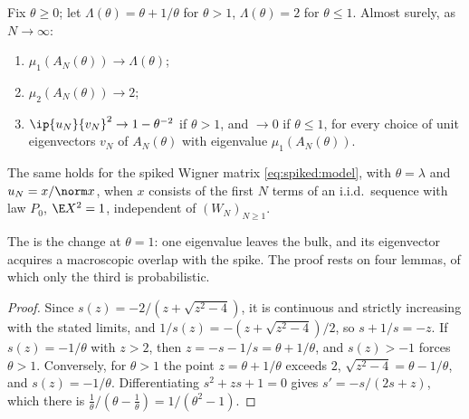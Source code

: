 \begin{refsection}
\begin{theorem}\label{thm:spiked:bbp}
Fix $\theta\ge0$; let $\Lambda(\theta)=\theta+1/\theta$ for $\theta>1$, $\Lambda(\theta)=2$ for $\theta\le1$. Almost surely, as $N\to\infty$:
\begin{enumerate}
\item $\mu_1(A_N(\theta))\to\Lambda(\theta)$;
\item $\mu_2(A_N(\theta))\to2$;
\item $\ip{u_N}{v_N}^2\to1-\theta^{-2}$ if $\theta>1$, and $\to0$ if $\theta\le1$, for every choice of unit eigenvectors $v_N$ of $A_N(\theta)$ with eigenvalue $\mu_1(A_N(\theta))$.
\end{enumerate}
The same holds for the spiked Wigner matrix \eqref{eq:spiked:model}, with $\theta=\lambda$ and $u_N=x/\norm x$, when $x$ consists of the first $N$ terms of an i.i.d.\ sequence with law $P_0$, $\E X^2=1$, independent of $(W_N)_{N\ge1}$.
\end{theorem}

The  is the change at $\theta=1$: one eigenvalue leaves the bulk, and its eigenvector acquires a macroscopic overlap with the spike. The proof rests on four lemmas, of which only the third is probabilistic.


\begin{proof}
Since $s(z)=-2/(z+\sqrt{z^2-4})$, it is continuous and strictly increasing with the stated limits, and $1/s(z)=-(z+\sqrt{z^2-4})/2$, so $s+1/s=-z$. If $s(z)=-1/\theta$ with $z>2$, then $z=-s-1/s=\theta+1/\theta$, and $s(z)>-1$ forces $\theta>1$. Conversely, for $\theta>1$ the point $z=\theta+1/\theta$ exceeds $2$, $\sqrt{z^2-4}=\theta-1/\theta$, and $s(z)=-1/\theta$. Differentiating $s^2+zs+1=0$ gives $s'=-s/(2s+z)$, which there is $\frac1\theta/(\theta-\frac1\theta)=1/(\theta^2-1)$.
\end{proof}


\end{refsection}
